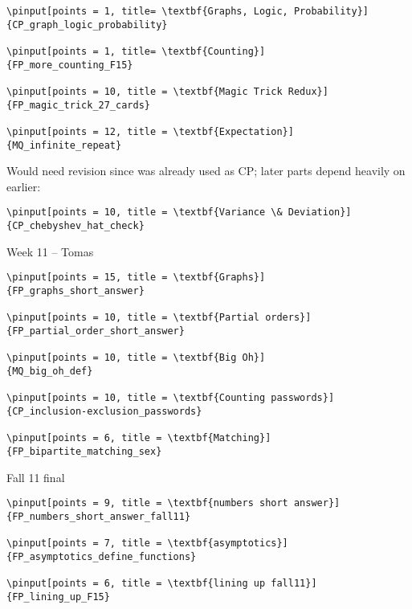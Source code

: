 \documentclass[quiz]{mcs}
\begin{document}

\begin{staffnotes}
\begin{verbatim}
\pinput[points = 1, title= \textbf{Graphs, Logic, Probability}]
{CP_graph_logic_probability}

\pinput[points = 1, title= \textbf{Counting}]
{FP_more_counting_F15}

\pinput[points = 10, title = \textbf{Magic Trick Redux}]
{FP_magic_trick_27_cards}

\pinput[points = 12, title = \textbf{Expectation}]
{MQ_infinite_repeat}

\end{verbatim}

Would need revision since was already used as CP;
later parts depend heavily on earlier:

\begin{verbatim}
\pinput[points = 10, title = \textbf{Variance \& Deviation}]
{CP_chebyshev_hat_check}
\end{verbatim}

\begin{center}
{\large Week 11 -- Tomas}
\end{center}

\begin{verbatim}
\pinput[points = 15, title = \textbf{Graphs}]
{FP_graphs_short_answer}

\pinput[points = 10, title = \textbf{Partial orders}]
{FP_partial_order_short_answer}

\pinput[points = 10, title = \textbf{Big Oh}]
{MQ_big_oh_def}

\pinput[points = 10, title = \textbf{Counting passwords}]
{CP_inclusion-exclusion_passwords}

\pinput[points = 6, title = \textbf{Matching}]
{FP_bipartite_matching_sex}
\end{verbatim}

Fall 11 final

\begin{verbatim}
\pinput[points = 9, title = \textbf{numbers short answer}]
{FP_numbers_short_answer_fall11}

\pinput[points = 7, title = \textbf{asymptotics}]
{FP_asymptotics_define_functions}

\pinput[points = 6, title = \textbf{lining up fall11}]
{FP_lining_up_F15}


\end{verbatim}
\end{staffnotes}
\end{document}
